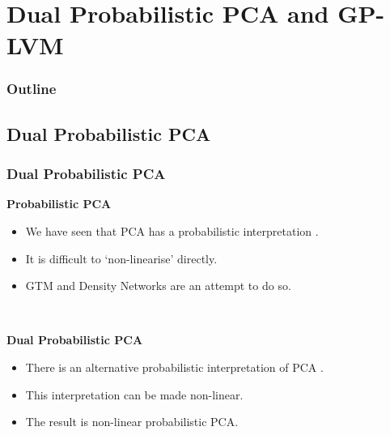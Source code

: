 \section{Dual Probabilistic PCA and GP-LVM}

\begin{frame}
  \frametitle{Outline}


\end{frame}

\subsection{Dual Probabilistic PCA}

\begin{frame}
  \frametitle{Dual Probabilistic PCA}

  \textbf{Probabilistic PCA}
  \begin{itemize}
  \item We have seen that PCA has a probabilistic interpretation {\scriptsize \citep{Tipping:probpca99}}.
  \item It is difficult to `non-linearise' directly.
  \item GTM and Density Networks are an attempt to do so.
  \end{itemize}
  ~

  \textbf{Dual Probabilistic PCA}
  \begin{itemize}
  \item There is an alternative probabilistic interpretation of PCA {\scriptsize \citep{Lawrence:pnpca05}}.
  \item This interpretation can be made non-linear.
  \item The result is non-linear probabilistic PCA.
  \end{itemize}

\end{frame}

